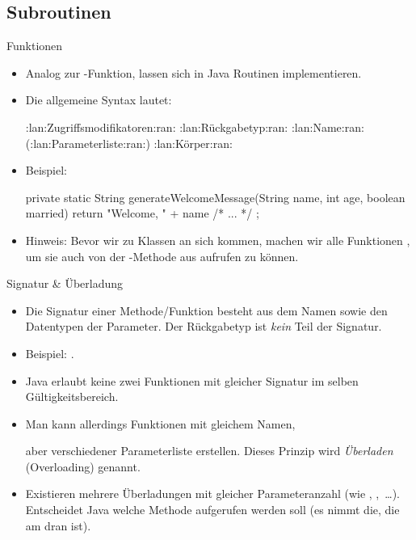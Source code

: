 \subsection{Subroutinen}
\begin{frame}[fragile]{Funktionen}
    \begin{itemize}[<+(1)->]
        \item Analog zur -Funktion, lassen sich in Java Routinen implementieren.
        \item Die allgemeine Syntax lautet:\pause{}
{\footnotesize
\begin{plainjava}
:lan:Zugriffsmodifikatoren:ran: :lan:Rückgabetyp:ran: :lan:Name:ran:(:lan:Parameterliste:ran:) {
    :lan:Körper:ran:
}
\end{plainjava}
}
        \item Beispiel: \pause{}
{\footnotesize
\begin{plainjava}
private static String generateWelcomeMessage(String name, int age,
        boolean married) {
    return "Welcome, " + name /* ... */ ;
}
\end{plainjava}
}
        \item Hinweis:\pause{} Bevor wir zu Klassen an sich kommen,\pause{} machen wir alle Funktionen ,\pause{} um sie auch von der -Methode aus aufrufen zu können.
    \end{itemize}
\end{frame}

\begin{frame}{Signatur \& Überladung}
    \begin{itemize}[<+(1)->]
        \item Die Signatur einer Methode/Funktion besteht aus dem Namen sowie den Datentypen der Parameter.\pause{} Der Rückgabetyp ist \emph{kein} Teil der Signatur.
        \item Beispiel: .
        \item Java erlaubt keine zwei Funktionen mit gleicher Signatur im selben Gültigkeitsbereich.
        \item Man kann allerdings Funktionen mit gleichem Namen,\par{} aber verschiedener Parameterliste erstellen.\pause{} Dieses Prinzip wird \emph{Überladen} (Overloading) genannt.
        \item Existieren mehrere Überladungen mit gleicher Parameteranzahl\pause{} (wie , ,~\ldots).\pause{} Entscheidet Java welche Methode aufgerufen werden soll\pause{} (es nimmt die,\pause{} die am  dran ist).
    \end{itemize}
\end{frame}



